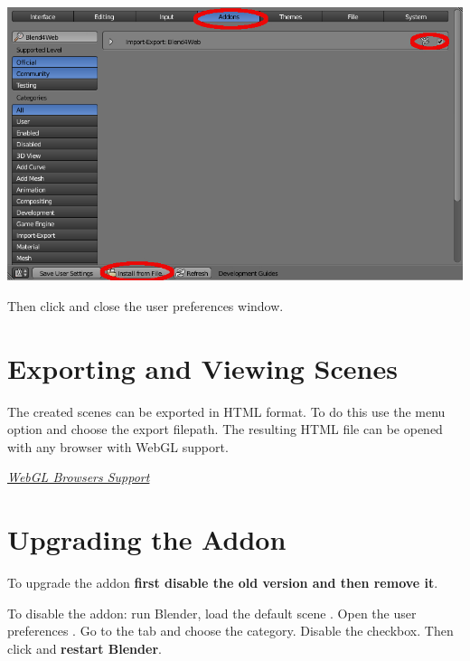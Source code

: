 \documentclass[a4paper,12pt,oneside]{sphinxmanual}
\begin{document}
{\hfill\includegraphics[width=1.000\linewidth]{user_preferences_install_b2w.jpg}\hfill}

\begin{DUlineblock}{0em}
\item[] 
\end{DUlineblock}

Then click  and close the user preferences window.


\section{Exporting and Viewing Scenes}
\label{first_steps:quick-install-export-viewer}\label{first_steps:id5}\label{first_steps:index-1}
The created scenes can be exported in HTML format. To do this use the  menu option and choose the export filepath. The resulting HTML file can be opened with any browser with WebGL support.




{\hyperref[about:browser-webgl-support]{\emph{WebGL Browsers Support}}}




\section{Upgrading the Addon}
\label{first_steps:id6}\label{first_steps:quick-install-addon-upgrade}\label{first_steps:index-2}
To upgrade the addon \textbf{first disable the old version and then remove it}.

To disable the addon: run Blender, load the default scene . Open the user preferences . Go to the  tab and choose the  category. Disable the  checkbox. Then click  and \textbf{restart Blender}.
\end{document}
